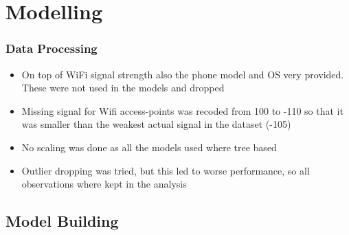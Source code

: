 \documentclass[10pt]{beamer}
\begin{document}
\section{Modelling}

\begin{frame}
\frametitle{Data Processing}

\begin{itemize}
    \item On top of WiFi signal strength also the phone model and OS very provided.
    These were not used in the models and dropped
    \pause
    \item Missing signal for Wifi access-points was recoded from 100 to -110 so that
    it was smaller than the weakest actual signal in the dataset (-105)
    \pause
    \item No scaling was done as all the models used where tree based
    \pause
    \item Outlier dropping was tried, but this led to worse performance, so all
    observations where kept in the analysis
\end{itemize}

\end{frame}

\subsection{Model Building}
\end{document}
